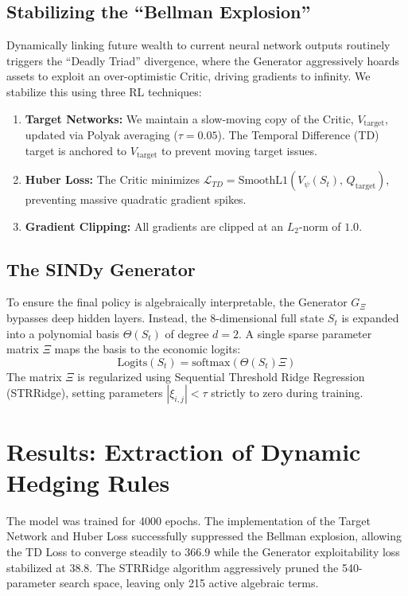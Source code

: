 \documentclass[11pt, a4paper]{article}
\begin{document}
\subsection{Stabilizing the ``Bellman Explosion''}
Dynamically linking future wealth to current neural network outputs routinely triggers the ``Deadly Triad'' divergence, where the Generator aggressively hoards assets to exploit an over-optimistic Critic, driving gradients to infinity. We stabilize this using three RL techniques:
\begin{enumerate}
    \item \textbf{Target Networks:} We maintain a slow-moving copy of the Critic, $V_{\text{target}}$, updated via Polyak averaging ($\tau=0.05$). The Temporal Difference (TD) target is anchored to $V_{\text{target}}$ to prevent moving target issues.
    \item \textbf{Huber Loss:} The Critic minimizes $\mathcal{L}_{TD} = \text{SmoothL1}(V_\psi(S_t), \, Q_{\text{target}})$, preventing massive quadratic gradient spikes.
    \item \textbf{Gradient Clipping:} All gradients are clipped at an $L_2$-norm of $1.0$.
\end{enumerate}

\subsection{The SINDy Generator}
To ensure the final policy is algebraically interpretable, the Generator $G_\Xi$ bypasses deep hidden layers. Instead, the 8-dimensional full state $S_t$ is expanded into a polynomial basis $\Theta(S_t)$ of degree $d=2$. A single sparse parameter matrix $\Xi$ maps the basis to the economic logits:
\begin{equation}
    \text{Logits}(S_t) = \text{softmax}(\Theta(S_t) \Xi)
\end{equation}
The matrix $\Xi$ is regularized using Sequential Threshold Ridge Regression (STRRidge), setting parameters $|\xi_{i,j}| < \tau$ strictly to zero during training.

\section{Results: Extraction of Dynamic Hedging Rules}

The model was trained for 4000 epochs. The implementation of the Target Network and Huber Loss successfully suppressed the Bellman explosion, allowing the TD Loss to converge steadily to $366.9$ while the Generator exploitability loss stabilized at $38.8$. The STRRidge algorithm aggressively pruned the 540-parameter search space, leaving only 215 active algebraic terms.
\end{document}
